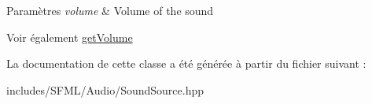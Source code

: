 \begin{DoxyParams}{Paramètres}
{\em volume} & Volume of the sound\\
\hline
\end{DoxyParams}
\begin{DoxySeeAlso}{Voir également}
\hyperlink{classsf_1_1SoundSource_a04243fb5edf64561689b1d58953fc4ce}{get\+Volume} 
\end{DoxySeeAlso}


La documentation de cette classe a été générée à partir du fichier suivant \+:\begin{DoxyCompactItemize}
\item 
includes/\+S\+F\+M\+L/\+Audio/Sound\+Source.\+hpp\end{DoxyCompactItemize}
